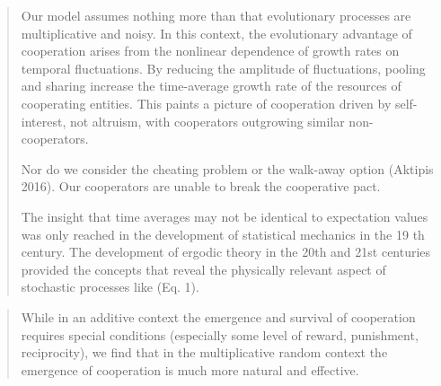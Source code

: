 \documentclass[a4paper,10pt]{article}
\begin{document}
\begin{quotation} \cite{peters-cooperation2019.03.04}
    Our model assumes nothing more than that evolutionary processes are multiplicative and noisy.
    In this context, the evolutionary advantage of cooperation arises from the nonlinear dependence of growth rates on temporal fluctuations.
    By reducing the amplitude of fluctuations, pooling and sharing increase the time-average growth rate of the resources of cooperating entities.
    This paints a picture of cooperation driven by self-interest, not altruism, with cooperators outgrowing similar non-cooperators.
    
    Nor do we consider the cheating problem or the walk-away option (Aktipis 2016).
    Our cooperators are unable to break the cooperative pact.
    
    The insight that time averages may not be identical to expectation values was only reached in the development of statistical mechanics in the 19 th century.
    The development of ergodic theory in the 20th and 21st centuries provided the concepts that reveal the physically relevant aspect of stochastic processes like (Eq. 1).
\end{quotation}


\begin{quotation}  \cite{yaari2010-cooperationEvolution}
While in an additive context the emergence and survival of cooperation requires special conditions (especially some level of reward, punishment, reciprocity), we find that in the multiplicative random context the emergence of cooperation is much more natural and effective.
\end{quotation}


{\footnotesize


}
\end{document}
